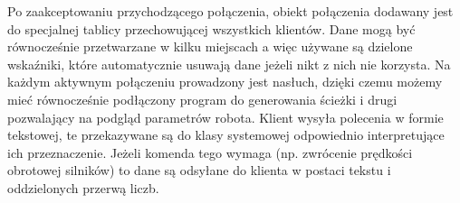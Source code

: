 Po zaakceptowaniu przychodzącego połączenia, obiekt połączenia dodawany jest do specjalnej tablicy przechowującej wszystkich klientów. 
Dane mogą być równocześnie przetwarzane w kilku miejscach a więc używane są dzielone wskaźniki, które automatycznie usuwają dane jeżeli nikt z nich nie korzysta.
Na każdym aktywnym połączeniu prowadzony jest nasłuch, dzięki czemu możemy mieć równocześnie podłączony program do generowania ścieżki i drugi pozwalający na podgląd parametrów robota.
Klient wysyła polecenia w formie tekstowej, te przekazywane są do klasy systemowej odpowiednio interpretujące ich przeznaczenie.
Jeżeli komenda tego wymaga (np. zwrócenie prędkości obrotowej silników) to dane są odsyłane do klienta w postaci tekstu i oddzielonych przerwą liczb. 